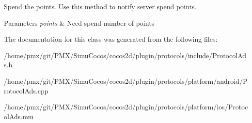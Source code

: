 Spend the points. Use this method to notify server spend points. 


\begin{DoxyParams}{Parameters}
{\em points} & Need spend number of points \\
\hline
\end{DoxyParams}


The documentation for this class was generated from the following files\+:\begin{DoxyCompactItemize}
\item 
/home/pmx/git/\+P\+M\+X/\+Simu\+Cocos/cocos2d/plugin/protocols/include/Protocol\+Ads.\+h\item 
/home/pmx/git/\+P\+M\+X/\+Simu\+Cocos/cocos2d/plugin/protocols/platform/android/Protocol\+Ads.\+cpp\item 
/home/pmx/git/\+P\+M\+X/\+Simu\+Cocos/cocos2d/plugin/protocols/platform/ios/Protocol\+Ads.\+mm\end{DoxyCompactItemize}

